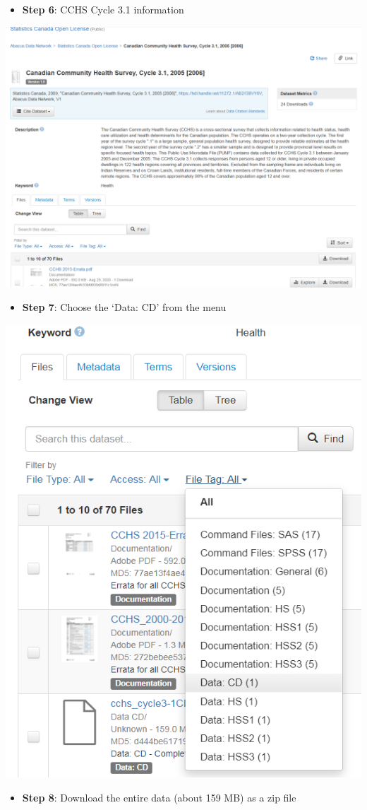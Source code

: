 \documentclass[
]{book}
\providecommand{\tightlist}{%
  \setlength{\itemsep}{0pt}\setlength{\parskip}{0pt}}
\begin{document}
\begin{itemize}
\tightlist
\item
  \textbf{Step 6}: CCHS Cycle 3.1 information
\end{itemize}

\includegraphics[width=0.65\linewidth]{images/abacus6X}

\begin{itemize}
\tightlist
\item
  \textbf{Step 7}: Choose the `Data: CD' from the menu
\end{itemize}

\includegraphics[width=0.65\linewidth]{images/abacusX7}

\begin{itemize}
\tightlist
\item
  \textbf{Step 8}: Download the entire data (about 159 MB) as a zip file
\end{itemize}
\end{document}
